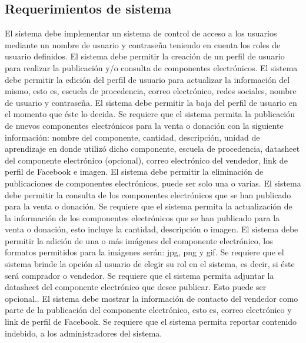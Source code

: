 \subsection{Requerimientos de sistema}

\begin{cdtRequirements}
		{El sistema debe implementar un sistema de control de acceso a los usuarios mediante un nombre de usuario y contraseña teniendo en cuenta los roles de usuario definidos.}
		{El sistema debe permitir la creación de un perfil de usuario para realizar la publicación y/o consulta de componentes electrónicos.}
		{El sistema debe permitir la edición del perfil de usuario para actualizar la información del mismo, esto es, escuela de procedencia, correo electrónico, redes sociales, nombre de usuario y contraseña.}
		{El sistema debe permitir la baja del perfil de usuario en el momento que éste lo decida.}
		{Se requiere que el sistema permita la publicación de nuevos componentes electrónicos para la venta o donación con la siguiente información: nombre del componente, cantidad, descripción, unidad de aprendizaje en donde utilizó dicho componente, escuela de procedencia, datasheet del componente electrónico (opcional), correo electrónico del vendedor, link de perfil de Facebook e imagen.}
	    {El sistema debe permitir la eliminación de publicaciones de componentes electrónicos, puede ser solo una o varias.}
	    {El sistema debe permitir la consulta de los componentes electrónicos que se han publicado para la venta o donación.}
	    {Se requiere que el sistema permita la actualización de la información de los componentes electrónicos que se han publicado para la venta o donación, esto incluye la cantidad, descripción o imagen.}
	    {El sistema debe permitir la adición de una o más imágenes del componente electrónico, los formatos permitidos para la imágenes serán: jpg, png y gif.}
	    {Se requiere que el sistema brinde la opción al usuario de elegir su rol en el sistema, es decir, si éste será comprador o vendedor.}
	    {Se requiere que el sistema permita adjuntar la datasheet del componente electrónico que desee publicar. Esto puede ser opcional..}
	    {El sistema debe mostrar la información de contacto del vendedor como parte de la publicación del componente electrónico, esto es, correo electrónico y link de perfil de Facebook.}
	    {Se requiere que el sistema permita reportar contenido indebido, a los administradores del sistema.}
	
\end{cdtRequirements}

